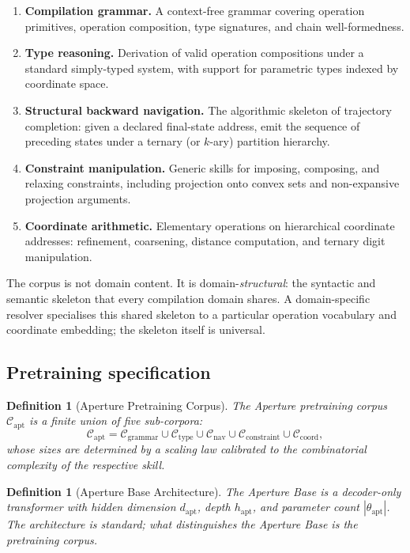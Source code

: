 \documentclass[twocolumn,11pt,a4paper]{article}
\newtheorem{definition}[theorem]{Definition}
\newcommand{\cC}{\mathcal{C}}
\begin{document}
\begin{enumerate}[leftmargin=*,itemsep=2pt]
\item \textbf{Compilation grammar.} A context-free grammar covering operation primitives, operation composition, type signatures, and chain well-formedness.
\item \textbf{Type reasoning.} Derivation of valid operation compositions under a standard simply-typed system, with support for parametric types indexed by coordinate space.
\item \textbf{Structural backward navigation.} The algorithmic skeleton of trajectory completion: given a declared final-state address, emit the sequence of preceding states under a ternary (or $k$-ary) partition hierarchy.
\item \textbf{Constraint manipulation.} Generic skills for imposing, composing, and relaxing constraints, including projection onto convex sets and non-expansive projection arguments.
\item \textbf{Coordinate arithmetic.} Elementary operations on hierarchical coordinate addresses: refinement, coarsening, distance computation, and ternary digit manipulation.
\end{enumerate}

The corpus is not domain content. It is domain-\emph{structural}: the syntactic and semantic skeleton that every compilation domain shares. A domain-specific resolver specialises this shared skeleton to a particular operation vocabulary and coordinate embedding; the skeleton itself is universal.

\subsection{Pretraining specification}

\begin{definition}[Aperture Pretraining Corpus]
\label{def:aperture-corpus}
The Aperture pretraining corpus $\cC_{\mathrm{apt}}$ is a finite union of five sub-corpora:
\begin{equation}
\cC_{\mathrm{apt}} = \cC_{\mathrm{grammar}} \cup \cC_{\mathrm{type}} \cup \cC_{\mathrm{nav}} \cup \cC_{\mathrm{constraint}} \cup \cC_{\mathrm{coord}},
\end{equation}
whose sizes are determined by a scaling law calibrated to the combinatorial complexity of the respective skill.
\end{definition}

\begin{definition}[Aperture Base Architecture]
\label{def:aperture-arch}
The Aperture Base is a decoder-only transformer \citep{vaswani2017attention,radford2019language} with hidden dimension $d_{\mathrm{apt}}$, depth $h_{\mathrm{apt}}$, and parameter count $|\theta_{\mathrm{apt}}|$. The architecture is standard; what distinguishes the Aperture Base is the pretraining corpus.
\end{definition}
\end{document}
